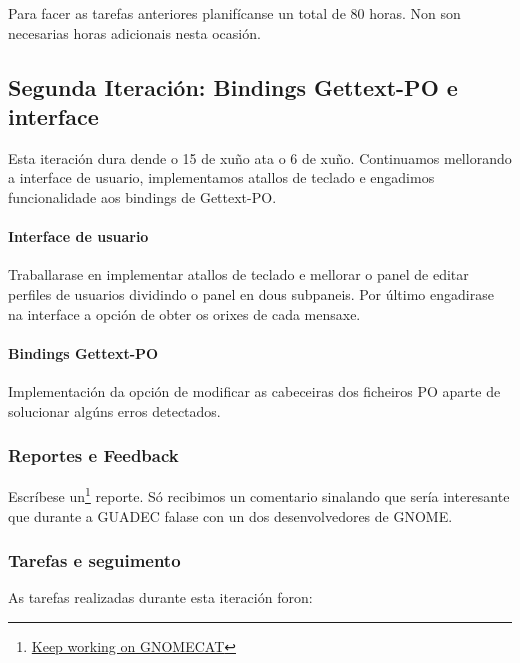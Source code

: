 Para facer as tarefas anteriores planifícanse un total de 80 horas. Non son necesarias horas adicionais nesta ocasión.

\subsection{Segunda Iteración: Bindings Gettext-PO e interface}
Esta iteración dura dende o 15 de xuño ata o 6 de xuño. Continuamos mellorando a interface de usuario, implementamos atallos de teclado e engadimos funcionalidade aos bindings de Gettext-PO.

\paragraph{Interface de usuario} Traballarase en implementar atallos de teclado e mellorar o panel de editar perfiles de usuarios dividindo o panel en dous subpaneis. Por último engadirase na interface a opción de obter os orixes de cada mensaxe.

\paragraph{Bindings Gettext-PO} Implementación da opción de modificar as cabeceiras dos ficheiros PO aparte de solucionar algúns erros detectados.

\subsubsection{Reportes e Feedback}

Escríbese un\footnote{\href{http://aquelando.info/keep-working-on-gnomecat/}{Keep working on GNOMECAT}} reporte. Só recibimos un comentario sinalando que sería interesante que durante a GUADEC falase con un dos desenvolvedores de GNOME.

\subsubsection{Tarefas e seguimento}

As tarefas realizadas durante esta iteración foron:

